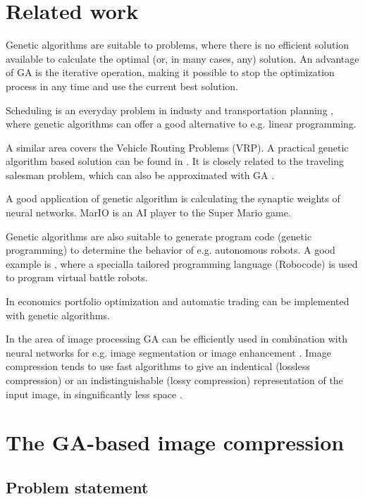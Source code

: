 \documentclass[conference]{IEEEtran}
\begin{document}
\section{Related work}

Genetic algorithms are suitable to problems, where
there is no efficient solution available to calculate
the optimal (or, in many cases, any) solution.
An advantage of GA is the iterative operation, making it possible
to stop the optimization process in any time and use the current
best solution.

Scheduling is an everyday problem in industy \cite{ga-scheduling}
and transportation planning \cite{ga-transport}, where genetic
algorithms can offer a good alternative to e.g. linear programming.

A similar area covers the Vehicle Routing Problems (VRP).
A practical genetic algorithm based solution can be found in \cite{ga-vrp}.
It is closely related to the traveling salesman problem, which
can also be approximated with GA \cite{ga-tsp}.

A good application of genetic algorithm is calculating
the synaptic weights of neural networks. MarIO \cite{mar-io}
is an AI player to the Super Mario game.

Genetic algorithms are also suitable to generate program code
(genetic programming) to determine the behavior of e.g.
autonomous robots. A good example is \cite{ga-robocode},
where a specialla tailored programming language (Robocode)
is used to program virtual battle robots.

In economics portfolio optimization \cite{ga-portfolio}
and automatic trading \cite{ga-trading}
can be implemented with genetic algorithms.

In the area of image processing GA can be
efficiently used in combination with neural networks for e.g.
image segmentation \cite{ga-imgseg} or image enhancement \cite{ga-imgenh}.
Image compression tends to use fast algorithms to give an
indentical (lossless compression) or an indistinguishable
(lossy compression) representation of the input image,
in singnificantly less space \cite{image-proc}.

\section{The GA-based image compression}

\subsection{Problem statement}
\end{document}
